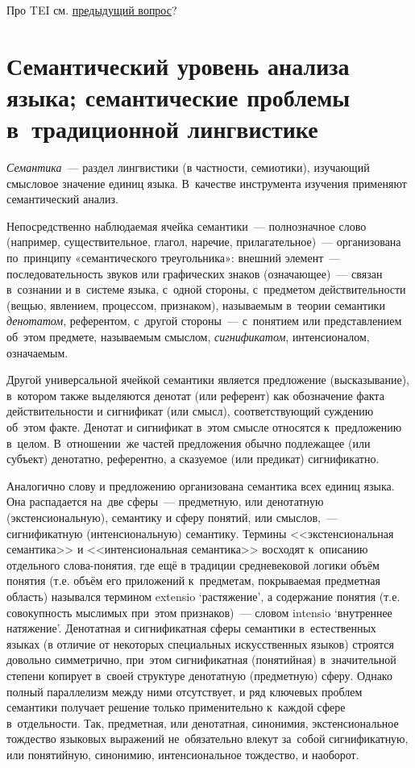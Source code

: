 \documentclass[12pt]{article}
\theoremstyle{definition}
\theoremstyle{remark}
\numberwithin{equation}{section}
\begin{document}
Про TEI см. \hyperref[sec:TEI]{предыдущий вопрос}?

\section{Семантический уровень анализа языка; семантические проблемы в~традиционной лингвистике}
\textsl{Семантика}~--- раздел лингвистики (в частности, семиотики),
изучающий смысловое значение единиц языка. В~качестве инструмента
изучения применяют семантический анализ.

Непосредственно наблюдаемая ячейка семантики~--- полнозначное слово
(например, существительное, глагол, наречие, прилагательное)~---
организована по~принципу «семантического треугольника»: внешний
элемент~--- последовательность звуков или графических знаков
(означающее)~--- связан в~сознании и в~системе языка, с~одной стороны,
с~предметом действительности (вещью, явлением, процессом, признаком),
называемым в~теории семантики {\sl денотатом}, референтом, с~другой стороны~---
с~понятием или представлением об~этом предмете, называемым смыслом,
{\sl сигнификатом}, интенсионалом, означаемым.

Другой универсальной ячейкой семантики является предложение (высказывание),
в~котором также выделяются денотат (или референт) как обозначение факта
действительности и сигнификат (или смысл), соответствующий суждению об~этом
факте. Денотат и сигнификат в~этом смысле относятся к~предложению в~целом.
В~отношении~же частей предложения обычно подлежащее (или субъект) денотатно,
референтно, а сказуемое (или предикат) сигнификатно.

Аналогично слову и предложению организована семантика всех единиц языка.
Она распадается на~две сферы~--- предметную, или денотатную (экстенсиональную),
семантику и сферу понятий, или смыслов,~--- сигнификатную (интенсиональную)
семантику. Термины <<экстенсиональная семантика>> и <<интенсиональная семантика>>
восходят к~описанию отдельного слова-понятия, где ещё в традиции средневековой
логики объём понятия (т.е. объём его приложений к~предметам, покрываемая
предметная область) назывался термином extensio ‘растяжение’, а содержание
понятия (т.е. совокупность мыслимых при~этом признаков)~--- словом intensio
‘внутреннее натяжение’. Денотатная и сигнификатная сферы семантики в~естественных
языках (в отличие от некоторых специальных искусственных языков) строятся
довольно симметрично, при~этом сигнификатная (понятийная) в~значительной
степени копирует в~своей структуре денотатную (предметную) сферу. Однако
полный параллелизм между ними отсутствует, и ряд ключевых проблем семантики
получает решение только применительно к~каждой сфере в~отдельности. Так,
предметная, или денотатная, синонимия, экстенсиональное тождество языковых
выражений не~обязательно влекут за~собой сигнификатную, или понятийную,
синонимию, интенсиональное тождество, и наоборот.
\end{document}
